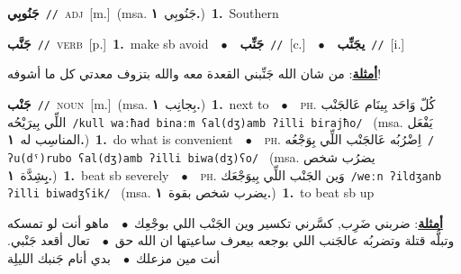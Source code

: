 \documentclass[10pt,a4paper,twoside]{article} %
\begin{document}
\begin{multicols}{2}
{\setlength\topsep{0pt}\textbf{\foreignlanguage{arabic}{جَنُوبِي}}\ {\color{gray}\texttt{//}\color{black}}\ \textsc{adj}\ [m.]\ \color{gray}(msa. \foreignlanguage{arabic}{جَنُوبِي}~\foreignlanguage{arabic}{\textbf{١.}})\color{black}\ \textbf{1.}~Southern\ } \vspace{2mm}

{\setlength\topsep{0pt}\textbf{\foreignlanguage{arabic}{جَنَّب}}\ {\color{gray}\texttt{//}\color{black}}\ \textsc{verb}\ [p.]\ \textbf{1.}~make sb avoid\ \ $\bullet$\ \ \setlength\topsep{0pt}\textbf{\foreignlanguage{arabic}{جَنِّب}}\ {\color{gray}\texttt{//}\color{black}}\ [c.]\ \ $\bullet$\ \ \setlength\topsep{0pt}\textbf{\foreignlanguage{arabic}{يجَنِّب}}\ {\color{gray}\texttt{//}\color{black}}\ [i.]\  \begin{flushright}\color{gray}\foreignlanguage{arabic}{\textbf{\underline{\foreignlanguage{arabic}{أمثلة}}}: من شان الله جَنِّبني القعدة معه والله بتزوف معدتي كل ما أشوفه!}\end{flushright}\color{black}} \vspace{2mm}

{\setlength\topsep{0pt}\textbf{\foreignlanguage{arabic}{جَنْب}}\ {\color{gray}\texttt{//}\color{black}}\ \textsc{noun}\ [m.]\ \color{gray}(msa. \foreignlanguage{arabic}{بِجانِب}~\foreignlanguage{arabic}{\textbf{١.}})\color{black}\ \textbf{1.}~next to\ \ $\bullet$\ \ \textsc{ph.} \color{gray} \foreignlanguage{arabic}{كُلّ وَاحَد بِينَام عَالجَنْب اللِّي بِيرَيْحُه}\color{black}\ {\color{gray}\texttt{/{\sffamily kull waːħad binaːm ʕal(dʒ)amb ʔilli birajħo}/}\color{black}}\ \color{gray} (msa. \foreignlanguage{arabic}{يَفْعَل المناسِب له}~\foreignlanguage{arabic}{\textbf{١.}})\color{black}\ \textbf{1.}~do what is convenient\ \ $\bullet$\ \ \textsc{ph.} \color{gray} \foreignlanguage{arabic}{اِضْرُبُه عَالجَنْب اللِّي بِوَجْعُه}\color{black}\ {\color{gray}\texttt{/{\sffamily ʔu(dˤ)rubo ʕal(dʒ)amb ʔilli biwa(dʒ)ʕo}/}\color{black}}\ \color{gray} (msa. \foreignlanguage{arabic}{يضرُب شخص بِِشِدَّة}~\foreignlanguage{arabic}{\textbf{١.}})\color{black}\ \textbf{1.}~beat sb severely\ \ $\bullet$\ \ \textsc{ph.} \color{gray} \foreignlanguage{arabic}{وَين الجَنْب اللِّي بِيوَجْعَك}\color{black}\ {\color{gray}\texttt{/{\sffamily weːn ʔildʒanb ʔilli biwadʒʕik}/}\color{black}}\ \color{gray} (msa. \foreignlanguage{arabic}{يضرب شخص بقوة}~\foreignlanguage{arabic}{\textbf{١.}})\color{black}\ \textbf{1.}~to beat sb up\  \begin{flushright}\color{gray}\foreignlanguage{arabic}{\textbf{\underline{\foreignlanguage{arabic}{أمثلة}}}: ضربني ضَرِب, كسَّرني تكسير وين الجَنْب اللي بوجْعِك\ $\bullet$\ \  ماهو أنت لو تمسكه وتبلُّه قتلة وتضربُه عالجَنب اللي بوجعه بيعرف ساعيتها ان الله حق\ $\bullet$\ \  تعال أقعد جَنْبي. أنت مين مزعلك\ $\bullet$\ \  بدي أنام جَنبك الليلِة}\end{flushright}\color{black}} \vspace{2mm}


\end{multicols}
\end{document}

